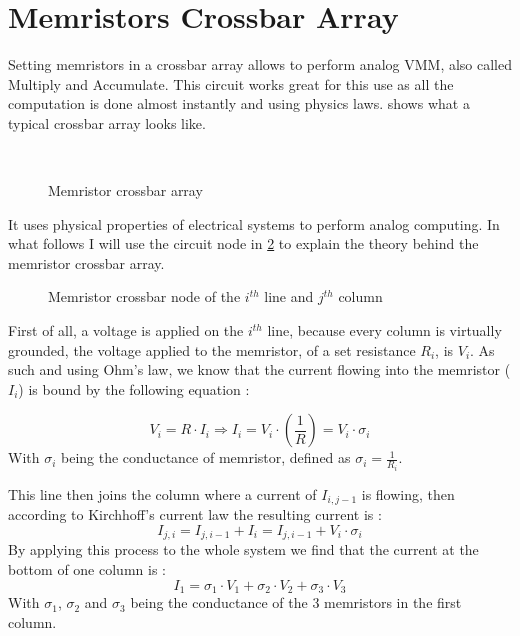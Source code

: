 \section{Memristors Crossbar Array}\label{sec:crossbar}

Setting memristors in a crossbar array allows to perform analog \ac{VMM}, also called Multiply and Accumulate. This circuit works great for this use as all the computation is done almost instantly and using physics laws.  shows what a typical crossbar array looks like.

\begin{figure}[H]
  \centering
  \hfill
  \\
  \caption{Memristor crossbar array}
  \label{fig:crossbar}
\end{figure}

It uses physical properties of electrical systems to perform analog computing. In what follows I will use the circuit node in \cref{fig:crossNode} to explain the theory behind the memristor crossbar array.
\begin{figure}[H]
  \centering
  
  \caption{Memristor crossbar node of the $i^{th}$ line and $j^{th}$ column}
  \label{fig:crossNode}
\end{figure}

First of all, a voltage is applied on the $i^{th}$ line, because every column is virtually grounded, the voltage applied to the memristor, of a set resistance $R_i$, is $V_i$. As such and using Ohm's law, we know that the current flowing into the memristor ($I_{i}$) is bound by the following equation :

\begin{equation}
  V_i = R\cdot I_{i} \Rightarrow I_{i} = V_i\cdot (\frac{1}{R})= V_i\cdot\sigma_i
\end{equation}
With $\sigma_i$ being the conductance of memristor, defined as $\sigma_i=\frac{1}{R_i}$.

This line then joins the column where a current of $I_{i,j-1}$ is flowing, then according to Kirchhoff's current law the resulting current is :
\begin{equation}
  I_{j,i} = I_{j,i-1}+I_{i} = I_{j,i-1} + V_i\cdot\sigma_i
\end{equation}
By applying this process to the whole system we find that the current at the bottom of one column is :
\begin{equation}
  I_1=\sigma_1\cdot V_1 + \sigma_2\cdot V_2 + \sigma_3\cdot V_3
\end{equation}
With $\sigma_1$, $\sigma_2$ and $\sigma_3$ being the conductance of the 3 memristors in the first column.

